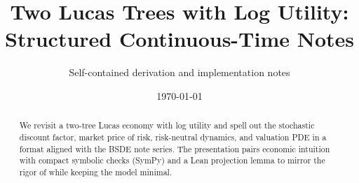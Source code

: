 ﻿\documentclass[11pt,letterpaper,oneside]{article}
\title{\vspace{-1.5em}Two Lucas Trees with Log Utility: Structured Continuous-Time Notes}
\author{%
\small Self-contained derivation and implementation notes
}
\date{\small \today}
\numberwithin{equation}{section}
\newcommand{\1}{\mathbf{1}}
\begin{document}
\maketitle

\begin{abstract}
\noindent
We revisit a two-tree Lucas economy with log utility and spell out the stochastic discount factor, market price of risk, risk-neutral dynamics, and valuation PDE in a format aligned with the BSDE note series. The presentation pairs economic intuition with compact symbolic checks (SymPy) and a Lean projection lemma to mirror the rigor of while keeping the model minimal.
\end{abstract}

\tableofcontents


\newpage
\clearpage
\end{document}
